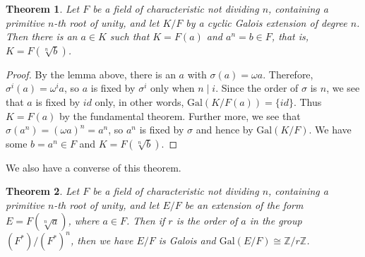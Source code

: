 \documentclass[12pt]{report}
\newtheorem{theorem}{Theorem}[section]
\theoremstyle{definition}
\newcommand{\ff}{\mathbb{F}}
\newcommand{\Gal}{\text{Gal}}
\newcommand{\ZZ}{\mathbb{Z}}
\begin{document}

\begin{theorem}\label{cyclicgal1}
	Let $F$ be a field  of characteristic not dividing $n$, containing a primitive $n$-th root of unity, and let $K/F$ by a cyclic Galois extension of degree $n$. Then there is an $a\in K$ such that $K=F(a)$ and $a^n=b\in F$, that is, $K=F(\sqrt[n]{b})$.
\end{theorem}

\begin{proof}
	By the lemma above, there is an $a$ with $\sigma(a)=\omega a$. Therefore, $\sigma^i(a)=\omega^ia$, so $a$ is fixed by $\sigma^i$ only when $n\mid i$. Since the order of $\sigma$ is $n$, we see that $a$ is fixed by $id$ only, in other words, $\Gal(K/F(a))=\{id\}$. Thus $K=F(a)$ by the fundamental theorem. Further more, we see that $\sigma(a^n)=(\omega a)^n=a^n$, so $a^n$ is fixed by $\sigma$ and hence by $\Gal(K/F)$. We have some $b=a^n\in F$ and $K=F(\sqrt[n]{b})$.
\end{proof}

We also have a converse of this theorem.

\begin{theorem}
	Let $F$ be a field of characteristic not dividing $n$, containing a primitive $n$-th root of unity, and let $E/F$ be an extension of the form $E=F(\sqrt[n]{a})$, where $a\in F$. Then if $r$ is the order of $a$ in the group $(F^*)/(F^*)^n$, then we have $E/F$ is Galois and $\Gal(E/F)\cong \ZZ/r\ZZ$.
\end{theorem}
\end{document}
